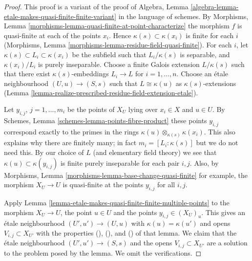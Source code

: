 \begin{proof}
This proof is a variant of the proof of
Algebra, Lemma \ref{algebra-lemma-etale-makes-quasi-finite-finite-variant}
in the language of schemes.
By Morphisms, Lemma \ref{morphisms-lemma-quasi-finite-at-point-characterize}
the morphism $f$ is quasi-finite at each of the points $x_i$.
Hence $\kappa(s) \subset \kappa(x_i)$ is finite for each $i$
(Morphisms, Lemma \ref{morphisms-lemma-residue-field-quasi-finite}).
For each $i$, let $\kappa(s) \subset L_i \subset \kappa(x_i)$
be the subfield such that $L_i/\kappa(s)$ is separable, and
$\kappa(x_i)/L_i$ is purely inseparable. Choose a finite Galois
extension $L/\kappa(s)$ such that there exist
$\kappa(s)$-embeddings $L_i \to L$ for $i = 1, \ldots, n$.
Choose an \'etale neighbourhood $(U, u) \to (S, s)$ such that
$L \cong \kappa(u)$ as $\kappa(s)$-extensions
(Lemma \ref{lemma-realize-prescribed-residue-field-extension-etale}).

\medskip\noindent
Let $y_{i, j}$, $j = 1, \ldots, m_i$ be the points of $X_U$
lying over $x_i \in X$ and $u \in U$. By
Schemes, Lemma \ref{schemes-lemma-points-fibre-product}
these points $y_{i, j}$ correspond exactly to the primes in the rings
$\kappa(u) \otimes_{\kappa(s)} \kappa(x_i)$. This also
explains why there are finitely many; in fact
$m_i = [L_i : \kappa(s)]$ but we do not need this.
By our choice of
$L$ (and elementary field theory)
we see that $\kappa(u) \subset \kappa(y_{i, j})$ is
finite purely inseparable for each pair $i, j$.
Also, by Morphisms, Lemma \ref{morphisms-lemma-base-change-quasi-finite}
for example, the morphism
$X_U \to U$ is quasi-finite at the points $y_{i, j}$ for
all $i, j$.

\medskip\noindent
Apply Lemma \ref{lemma-etale-makes-quasi-finite-finite-multiple-points}
to the morphism $X_U \to U$, the point $u \in U$
and the points $y_{i, j} \in (X_U)_u$. This gives an \'etale neighbourhood
$(U', u') \to (U, u)$ with $\kappa(u) = \kappa(u')$ and
opens $V_{i, j} \subset X_{U'}$ with the properties
(), (), and ()
of that lemma. We claim that the \'etale neighbourhood
$(U', u') \to (S, s)$ and the opens $V_{i, j} \subset X_{U'}$
are a solution to the problem posed by the lemma.
We omit the verifications.
\end{proof}

